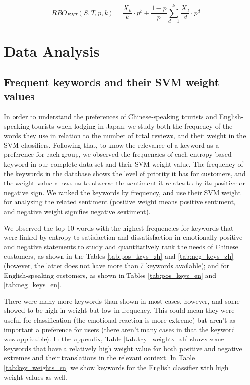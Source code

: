\documentclass[review]{elsarticle}
\begin{document}
\begin{equation}\label{eq:rbo_ext}
RBO_{EXT}(S,T,p,k) = \frac{X_k}{k} \cdot p^k + \frac{1-p}{p} \sum_{d=1}^k{\frac{X_d}{d} \cdot p^d}
\end{equation}

\section{Data Analysis}\label{dataanalysis}

\subsection{Frequent keywords and their SVM weight values}\label{svmresults}

In order to understand the preferences of Chinese-speaking tourists and English-speaking tourists when lodging in Japan, we study both the frequency of the words they use in relation to the number of total reviews, and their weight in the SVM classifiers. Following that, to know the relevance of a keyword as a preference for each group, we observed the frequencies of each entropy-based keyword in our complete data set and their SVM weight value. The frequency of the keywords in the database shows the level of priority it has for customers, and the weight value allows us to observe the sentiment it relates to by its positive or negative sign. We ranked the keywords by frequency, and use their SVM weight for analyzing the related sentiment (positive weight means positive sentiment, and negative weight signifies negative sentiment). 

We observed the top 10 words with the highest frequencies for keywords that were linked by entropy to satisfaction and dissatisfaction in emotionally positive and negative statements to study and quantitatively rank the needs of Chinese customers, as shown in the Tables \ref{tab:pos_keys_zh} and \ref{tab:neg_keys_zh} (however, the latter does not have more than 7 keywords available); and for English-speaking customers, as shown in Tables \ref{tab:pos_keys_en} and \ref{tab:neg_keys_en}.

There were many more keywords than shown in most cases, however, and some showed to be high in weight but low in frequency. This could mean they were useful for classification (the emotional reaction is more extreme) but aren't as important a preference for users (there aren't many cases in that the keyword was applicable). In the appendix, Table \ref{tab:key_weights_zh} shows some keywords that have a relatively high weight value for both positive and negative extremes and their translations in the relevant context. In Table \ref{tab:key_weights_en} we show keywords for the English classifier with high weight values as well.
\end{document}
